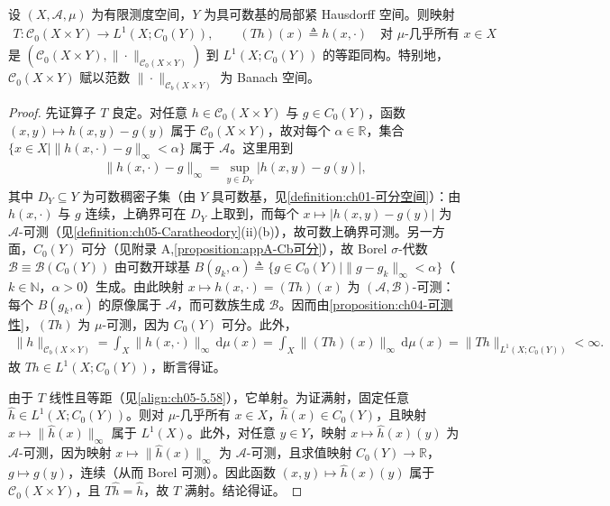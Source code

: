 \documentclass[../../main.tex]{subfiles}%
\begin{document}
\begin{proposition}\label{proposition:ch05-Caratheodory同构}
设 $(X,\mathcal{A},\mu)$ 为有限测度空间，$Y$ 为具可数基的局部紧 Hausdorff 空间。则映射
\begin{align}
T:\mathcal{C}_0(X\times Y)\to L^1(X;C_0(Y)),\qquad
(Th)(x)\triangleq h(x,\cdot)
\quad\text{对 }\mu\text{-几乎所有 }x\in X\label{align:ch05-5.57}
\end{align}
是 $(\mathcal{C}_0(X\times Y),\|\cdot\|_{\mathcal{C}_0(X\times Y)})$ 到 $L^1(X;C_0(Y))$ 的等距同构。特别地，$\mathcal{C}_0(X\times Y)$ 赋以范数 $\|\cdot\|_{\mathcal{C}_b(X\times Y)}$ 为 Banach 空间。
\end{proposition}

\begin{proof}
先证算子 $T$ 良定。对任意 $h\in\mathcal{C}_0(X\times Y)$ 与 $g\in C_0(Y)$，函数 $(x,y)\mapsto h(x,y)-g(y)$ 属于 $\mathcal{C}_0(X\times Y)$，故对每个 $\alpha\in\mathbb{R}$，集合 $\{x\in X\mid\|h(x,\cdot)-g\|_\infty<\alpha\}$ 属于 $\mathcal{A}$。这里用到
\begin{align*}
\|h(x,\cdot)-g\|_\infty=\sup_{y\in D_Y}|h(x,y)-g(y)|,
\end{align*}
其中 $D_Y\subseteq Y$ 为可数稠密子集（由 $Y$ 具可数基，见\cref{definition:ch01-可分空间}）：由 $h(x,\cdot)$ 与 $g$ 连续，上确界可在 $D_Y$ 上取到，而每个 $x\mapsto|h(x,y)-g(y)|$ 为 $\mathcal{A}$-可测（见\cref{definition:ch05-Caratheodory}(ii)(b)），故可数上确界可测。另一方面，$C_0(Y)$ 可分（见附录 A,\cref{proposition:appA-Cb可分}），故 Borel $\sigma$-代数 $\mathscr{B}\equiv\mathscr{B}(C_0(Y))$ 由可数开球基 $B(g_k,\alpha)\triangleq \{g\in C_0(Y)\mid\|g-g_k\|_\infty<\alpha\}$（$k\in\mathbb{N}$，$\alpha>0$）生成。由此映射 $x\mapsto h(x,\cdot)=(Th)(x)$ 为 $(\mathcal{A},\mathscr{B})$-可测：每个 $B(g_k,\alpha)$ 的原像属于 $\mathcal{A}$，而可数族生成 $\mathscr{B}$。因而由\cref{proposition:ch04-可测性}，$(Th)$ 为 $\mu$-可测，因为 $C_0(Y)$ 可分。此外，
\begin{align}
\|h\|_{\mathcal{C}_b(X\times Y)}
=\int_X\|h(x,\cdot)\|_\infty\,\mathrm{d}\mu(x)
=\int_X\|(Th)(x)\|_\infty\,\mathrm{d}\mu(x)
=\|Th\|_{L^1(X;C_0(Y))}<\infty.\label{align:ch05-5.58}
\end{align}
故 $Th\in L^1(X;C_0(Y))$，断言得证。

由于 $T$ 线性且等距（见\eqref{align:ch05-5.58}），它单射。为证满射，固定任意 $\hat{h}\in L^1(X;C_0(Y))$。则对 $\mu$-几乎所有 $x\in X$，$\hat{h}(x)\in C_0(Y)$，且映射 $x\mapsto\|\hat{h}(x)\|_\infty$ 属于 $L^1(X)$。此外，对任意 $y\in Y$，映射 $x\mapsto\hat{h}(x)(y)$ 为 $\mathcal{A}$-可测，因为映射 $x\mapsto\|\hat{h}(x)\|_\infty$ 为 $\mathcal{A}$-可测，且求值映射 $C_0(Y)\to\mathbb{R}$，$g\mapsto g(y)$，连续（从而 Borel 可测）。因此函数 $(x,y)\mapsto\hat{h}(x)(y)$ 属于 $\mathcal{C}_0(X\times Y)$，且 $T\hat{h}=\hat{h}$，故 $T$ 满射。结论得证。
\end{proof}
\end{document}
